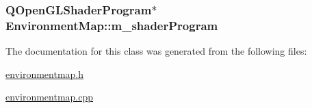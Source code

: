 \hypertarget{class_environment_map_aab51ee095ecbe9fcaab64d5c8d3b3ab3}{
\subsubsection[{m\+\_\+shader\+Program}]{\setlength{\rightskip}{0pt plus 5cm}Q\+Open\+G\+L\+Shader\+Program$\ast$ Environment\+Map\+::m\+\_\+shader\+Program\hspace{0.3cm}{\ttfamily [protected]}}}\label{class_environment_map_aab51ee095ecbe9fcaab64d5c8d3b3ab3}


The documentation for this class was generated from the following files\+:\begin{DoxyCompactItemize}
\item 
\hyperlink{environmentmap_8h}{environmentmap.\+h}\item 
\hyperlink{environmentmap_8cpp}{environmentmap.\+cpp}\end{DoxyCompactItemize}
